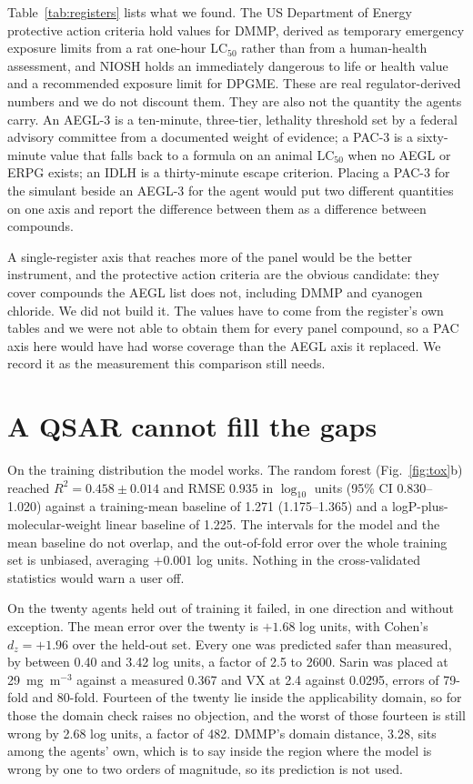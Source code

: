 \documentclass[journal=jacsat,manuscript=suppinfo,margin=1in]{achemso}
\begin{document}
Table~\ref{tab:registers} lists what we found. The US Department of Energy
protective action criteria hold values for DMMP, derived as temporary
emergency exposure limits from a rat one-hour LC$_{50}$ rather than from a
human-health assessment, and NIOSH holds an immediately dangerous to life or
health value and a recommended exposure limit for DPGME. These are real
regulator-derived numbers and we do not discount them. They are also not the
quantity the agents carry. An AEGL-3 is a ten-minute, three-tier, lethality
threshold set by a federal advisory committee from a documented weight of
evidence; a PAC-3 is a sixty-minute value that falls back to a formula on an
animal LC$_{50}$ when no AEGL or ERPG exists; an IDLH is a thirty-minute
escape criterion. Placing a PAC-3 for the simulant beside an AEGL-3 for the
agent would put two different quantities on one axis and report the difference
between them as a difference between compounds.

A single-register axis that reaches more of the panel would be the better
instrument, and the protective action criteria are the obvious candidate: they
cover compounds the AEGL list does not, including DMMP and cyanogen chloride.
We did not build it. The values have to come from the register's own tables
and we were not able to obtain them for every panel compound, so a PAC axis
here would have had worse coverage than the AEGL axis it replaced. We record
it as the measurement this comparison still needs.



\section{A QSAR cannot fill the gaps}
\label{res:qsar}

On the training distribution the model works. The random forest
(Fig.~\ref{fig:tox}b) reached $R^{2}=0.458 \pm 0.014$ and RMSE $0.935$ in
$\log_{10}$ units (95\% CI 0.830--1.020) against a training-mean baseline of
1.271 (1.175--1.365) and a logP-plus-molecular-weight linear baseline of 1.225.
The intervals for the model and the mean baseline do not overlap, and the
out-of-fold error over the whole training set is unbiased, averaging $+0.001$ log
units. Nothing in the cross-validated statistics would warn a user off.

On the twenty agents held out of training it failed, in one direction and without
exception. The mean error over the twenty is $+1.68$ log units, with
Cohen's $d_{z}=+1.96$ over the held-out set. Every one was predicted safer than measured, by between 0.40 and 3.42
log units, a factor of 2.5 to 2600. Sarin was placed at 29~mg~m$^{-3}$ against a
measured 0.367 and VX at 2.4 against 0.0295, errors of 79-fold and 80-fold.
Fourteen of the twenty lie inside the applicability domain, so for those the
domain check raises no objection, and the worst of those fourteen is still wrong
by 2.68 log units, a factor of 482. DMMP's domain distance, 3.28, sits among the
agents' own, which is to say inside the region where the model is wrong by one to
two orders of magnitude, so its prediction is not used.
\end{document}
